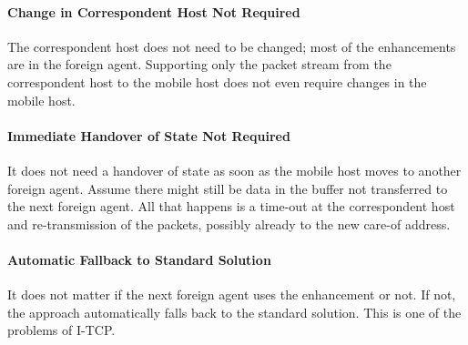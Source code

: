 \paragraph*{Change in Correspondent Host Not Required}
The correspondent host does not need to be changed; most of the enhancements are in the foreign agent. Supporting only the packet stream from the
correspondent host to the mobile host does not even require changes in the mobile host.

\paragraph*{Immediate Handover of State Not Required}
It does not need a handover of state as soon as the mobile host moves to another foreign agent. Assume there might still be data in the buffer not
transferred to the next foreign agent. All that happens is a time-out at the correspondent host and re-transmission of the packets, possibly already to
the new care-of address.

\paragraph*{Automatic Fallback to Standard Solution}
It does not matter if the next foreign agent uses the enhancement or not. If not, the approach automatically falls back to the standard solution. This is one of the problems of I-TCP.

%	
%	
%	

